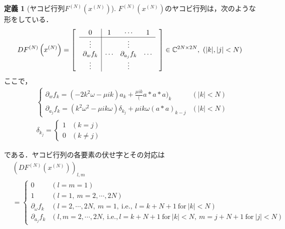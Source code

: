\documentclass[11pt,a4paper,titlepage]{jsreport}
\theoremstyle{definition}
\newtheorem{dfn}{定義}
\begin{document}
\begin{dfn}[ヤコビ行列$F^{(N)}\left(x^{(N)}\right)$]
  $F^{(N)}\left(x^{(N)}\right)$のヤコビ行列は，次のような形をしている．
  \begin{equation*}
    DF^{(N)}\left(x^{(N)}\right)=\begin{bmatrix}
       & \multicolumn{1}{c|}{0}              & 1      & \cdots            & 1      & \\ \cline{2-5}
       & \multicolumn{1}{c|}{\vdots}         &        & \vdots            &        & \\
       & \multicolumn{1}{c|}{\partial_w f_k} & \cdots & \partial_{a_j}f_k & \cdots & \\
       & \multicolumn{1}{c|}{\vdots}         &        & \vdots            &        & \\
    \end{bmatrix}
    \in \mathbb{C}^{2N\times 2N},\ \left(|k|,|j|<N\right)
  \end{equation*}
  ここで，
  \begin{align*}
     & \begin{cases}
         \partial_w f_k = (-2k^2\omega - \mu ik)a_k + \frac{\mu ik}(a*a*a)_k                     & (|k|<N) \\
         \partial_{a_j} f_k = (k^2\omega^2 - \mu ik\omega)\delta_{k_j} + \mu ik\omega(a*a)_{k-j} & (|k|<N)
       \end{cases}
    \\
     & \delta_{k_j} = \begin{cases}
                        1 & (k=j)     \\
                        0 & (k\neq j)
                      \end{cases}
  \end{align*}
\end{dfn}
である．ヤコビ行列の各要素の伏せ字とその対応は
\begin{align*}
   & \left(DF^{(N)}\left(x^{(N)}\right)\right)_{l,m}                                                                                        \\
   & = \begin{cases}
         0                   & \left(l=m=1\right)                                                                                             \\
         1                   & \left(l=1,\ m= 2,\cdots,2N\right)                                                                              \\
         \partial_\omega f_k & \left(l=2,\cdots,2N,\ m=1, \ \mathrm{i.e.},\ l=k+N+1 \ \mathrm{for} \ |k|<N\right)                             \\
         \partial_{a_j}f_k   & \left(l,m=2,\cdots,2N, \ \mathrm{i.e.}, l=k+N+1 \ \mathrm{for} \ |k|<N,\ m=j+N+1 \ \mathrm{for} \ |j|<N\right)
       \end{cases}
\end{align*}
\end{document}
